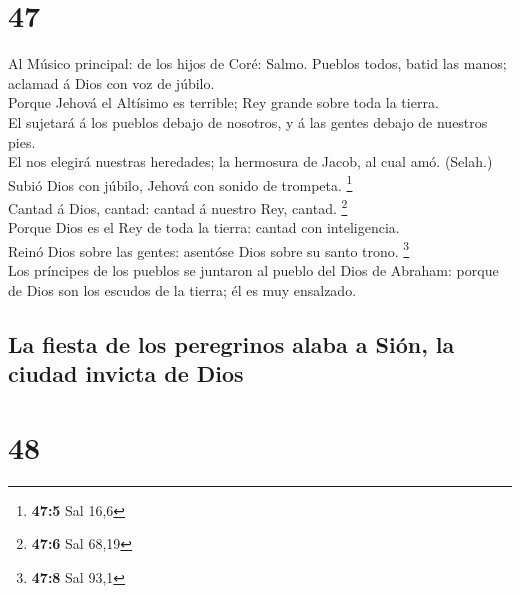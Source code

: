 \hypertarget{section-46}{%
\section{47}\label{section-46}}

 Al Músico principal: de los hijos de Coré: Salmo. Pueblos
todos, batid las manos; aclamad á Dios con voz de júbilo.\\
 Porque Jehová el Altísimo es terrible; Rey grande sobre
toda la tierra.\\
 El sujetará á los pueblos debajo de nosotros, y á las
gentes debajo de nuestros pies.\\
 El nos elegirá nuestras heredades; la hermosura de Jacob,
al cual amó. (Selah.)\\
 Subió Dios con júbilo, Jehová con sonido de trompeta.
\footnote{\textbf{47:5} Sal 16,6}\\
 Cantad á Dios, cantad: cantad á nuestro Rey, cantad.
\footnote{\textbf{47:6} Sal 68,19}\\
 Porque Dios es el Rey de toda la tierra: cantad con
inteligencia.\\
 Reinó Dios sobre las gentes: asentóse Dios sobre su santo
trono. \footnote{\textbf{47:8} Sal 93,1}\\
 Los príncipes de los pueblos se juntaron al pueblo del Dios
de Abraham: porque de Dios son los escudos de la tierra; él es muy
ensalzado.

\hypertarget{la-fiesta-de-los-peregrinos-alaba-a-siuxf3n-la-ciudad-invicta-de-dios}{%
\subsection{La fiesta de los peregrinos alaba a Sión, la ciudad invicta
de
Dios}\label{la-fiesta-de-los-peregrinos-alaba-a-siuxf3n-la-ciudad-invicta-de-dios}}

\hypertarget{section-47}{%
\section{48}\label{section-47}}

